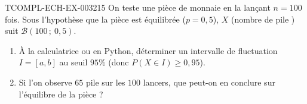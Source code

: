 \begin{exercice}{TCOMPL-ECH-EX-003}{2}{15}
On teste une pièce de monnaie en la lançant $n=100$ fois. Sous l'hypothèse que la pièce est équilibrée ($p=0{,}5$), $X$ (nombre de \og pile \fg{}) suit $\mathcal{B}(100\,;\ 0{,}5)$.
\begin{enumerate}
  \item À la calculatrice ou en Python, déterminer un intervalle de fluctuation $I=[a,b]$ au seuil $95\%$ (donc $P(X\in I)\geq0{,}95$).
  \item Si l'on observe $65$ \og pile \fg{} sur les $100$ lancers, que peut-on en conclure sur l'équilibre de la pièce ?
\end{enumerate}
\end{exercice}
